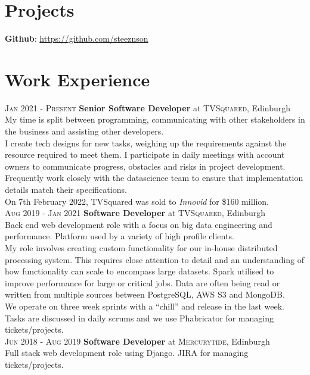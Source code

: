 \documentclass[14pt, a4paper]{extarticle}
\begin{document}
\begin{multicols}{2}
\section{Projects}
\noindent\textbf{Github}: \url{https://github.com/steeznson}

\columnbreak
\section{Work Experience}
\noindent\textsc{Jan 2021 - Present} \textbf{Senior Software Developer}
at \textsc{TVSquared}, Edinburgh\\
My time is split between programming, communicating with other stakeholders in the business and assisting other developers.\\
I create tech designs for new tasks, weighing up the requirements against the resource required to meet them. I participate in daily meetings with account owners to communicate progress, obstacles and risks in project development.\\
Frequently work closely with the datascience team to ensure that implementation details match their specifications.\\
On 7th February 2022, TVSquared was sold to \textit{Innovid} for \$160 million.\\
\noindent\textsc{Aug 2019 - Jan 2021} \textbf{Software Developer}
at \textsc{TVSquared}, Edinburgh\\
Back end web development role with a focus on big data engineering and performance. Platform used by a variety of high profile clients.\\
My role involves creating custom functionality for our in-house distributed processing system. This requires close attention to detail and an understanding of how functionality can scale to encompass large datasets. Spark utilised to improve performance for large or critical jobs. Data are often being read or written from multiple sources between PostgreSQL, AWS S3 and MongoDB.\\
We operate on three week sprints with a ``chill'' and release in the last week.  Tasks are discussed in daily scrums and we use Phabricator for managing tickets/projects.\\
\noindent\textsc{Jun 2018 - Aug 2019} \textbf{Software Developer}
at \textsc{Mercurytide}, Edinburgh\\
Full stack web development role using Django. JIRA for managing tickets/projects.\\
\end{multicols}
\end{document}
